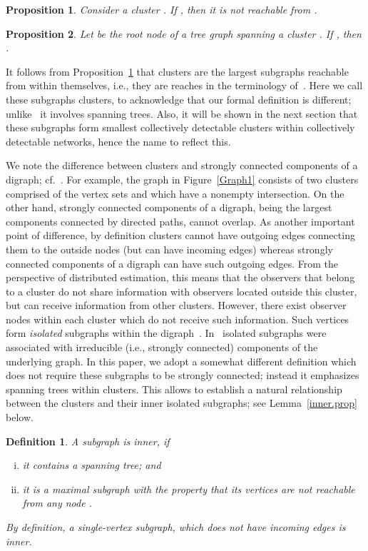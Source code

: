 \documentclass[a4paper,10pt,conference]{ieeeconf}
\newtheorem{definition}{Definition}
\newtheorem{proposition}{Proposition}
\begin{document}
\begin{proposition}\label{cluster.closed}
Consider a cluster . If
, then it is not reachable from
.  
\end{proposition}

\begin{proposition}\label{roots.unreach}
Let  be the root node of a tree graph spanning a cluster
. If , then . 
\end{proposition}


It follows from Proposition~\ref{cluster.closed} that clusters are
the largest subgraphs reachable from within themselves, i.e., they
are reaches in the terminology of~\cite{CV-2006}. Here we call these subgraphs
clusters, to acknowledge that our formal definition is 
different; unlike~\cite{CV-2006} it involves spanning trees. 
Also, it will be shown in the next section that these subgraphs form
smallest collectively detectable clusters within collectively detectable
networks, hence the name to reflect this. 

We note the
difference between clusters and strongly connected components of a
digraph; cf.~\cite{FFS-2010}. For example, the graph in
Figure~\ref{Graph1} consists of two 
clusters comprised of the vertex sets  and
 which have a nonempty intersection. On the other hand,
strongly connected components of a
digraph, being the largest components connected by directed paths,
cannot overlap. As another important point of difference, by definition clusters
cannot have outgoing edges connecting them to the outside nodes
(but can have incoming edges) whereas 
strongly connected components of a digraph can have such outgoing edges.
From the perspective of distributed estimation, this means that the
observers that belong to a cluster do not 
share information with observers located outside this cluster, but can receive
information from other clusters. However, there exist 
observer nodes within each cluster which do not receive such
information. Such vertices form \emph{isolated} subgraphs within
the digraph~\cite{FFS-2010}. In~\cite{FFS-2010} isolated subgraphs were
associated with irreducible (i.e., strongly connected) components of the
underlying graph. In this paper, we adopt a somewhat different definition
which does not require these
subgraphs to be strongly connected; instead it emphasizes spanning trees
within clusters. This allows to establish a natural relationship between
the clusters and their inner isolated subgraphs; see Lemma~\ref{inner.prop}
below. 

\begin{definition}\label{inner-cluster}
A subgraph  is \emph{inner}, if 
\begin{enumerate}[(i)]
\item
it contains a spanning tree; and
\item   
it is a maximal subgraph with the property that its vertices 
are not reachable from any node .
\end{enumerate}   
By definition, a single-vertex subgraph, which does not have incoming edges
is inner. 
\end{definition}
\end{document}
